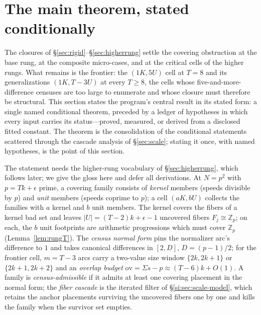 \documentclass[11pt,a4paper]{article}
\numberwithin{equation}{section}
\theoremstyle{plain}
\theoremstyle{plain}
\theoremstyle{definition}
\theoremstyle{remark}
\newcommand{\Z}{\mathbb{Z}}
\begin{document}

\section{The main theorem, stated conditionally}\label{sec:SC}

The closures of \S\ref{sec:rigid}--\S\ref{sec:higherrung} settle the
covering obstruction at the base rung, at the composite micro-cases, and
at the critical cells of the higher rungs. What remains is the frontier:
the $(1K,5U)$ cell at $T=8$ and its generalizations $(1K,T{-}3U)$ at
every $T\ge 8$, the cells whose five-and-more-difference censuses are too
large to enumerate and whose closure must therefore be structural. This
section states the program's central result in its stated form:
a single named conditional theorem, preceded by a ledger of
hypotheses in which every input carries its status---proved, measured,
or derived from a disclosed fitted constant. The theorem is the
consolidation of the conditional statements scattered through the
cascade analysis of \S\ref{sec:scale}; stating it once, with named
hypotheses, is the point of this section.

The statement needs the higher-rung vocabulary of
\S\ref{sec:higherrung}, which follows later; we give the gloss here and
defer all derivations. At $N=p^2$ with $p=Tk+\epsilon$ prime, a covering
family consists of \emph{kernel} members (speeds divisible by $p$) and
\emph{unit} members (speeds coprime to $p$); a cell $(aK,bU)$ collects
the families with $a$ kernel and $b$ unit members. The kernel covers the
fibers of a kernel bad set and leaves $|U|=(T-2)k+\epsilon-1$ uncovered
fibers $F_j\cong\Z_p$; on each, the $b$ unit footprints are arithmetic
progressions which must cover $\Z_p$ (Lemma~\ref{lem:rungT}). The
\emph{census normal form} pins the normalizer arc's difference to $1$
and takes canonical differences in $[2,D]$, $D=(p-1)/2$; for the
frontier cell, $m=T-3$ arcs carry a two-value size window
$\{2k,2k+1\}$ or $\{2k+1,2k+2\}$ and an \emph{overlap budget}
$\mathrm{ov}=\Sigma s-p\approx(T-6)k+O(1)$. A family is
\emph{census-admissible} if it admits at least one covering placement in
the normal form; the \emph{fiber cascade} is the iterated filter of
\S\ref{si:sec:scale-model}, which retains the anchor placements surviving
the uncovered fibers one by one and kills the family when the survivor
set empties.
\end{document}
